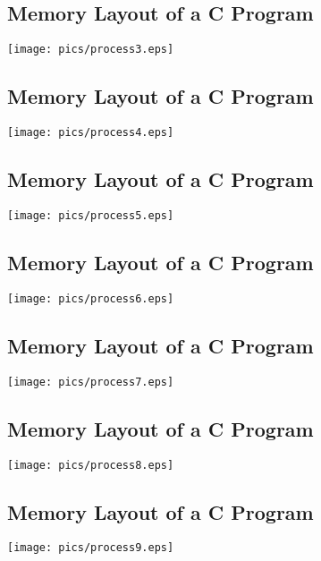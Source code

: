 \documentclass[xga]{xdvislides}
\begin{document}
\subsection{Memory Layout of a C Program}
\begin{center}
	\texttt{[image: pics/process3.eps]}
\end{center}

\subsection{Memory Layout of a C Program}
\begin{center}
	\texttt{[image: pics/process4.eps]}
\end{center}

\subsection{Memory Layout of a C Program}
\begin{center}
	\texttt{[image: pics/process5.eps]}
\end{center}

\subsection{Memory Layout of a C Program}
\begin{center}
	\texttt{[image: pics/process6.eps]}
\end{center}

\subsection{Memory Layout of a C Program}
\begin{center}
	\texttt{[image: pics/process7.eps]}
\end{center}

\subsection{Memory Layout of a C Program}
\begin{center}
	\texttt{[image: pics/process8.eps]}
\end{center}

\subsection{Memory Layout of a C Program}
\begin{center}
	\texttt{[image: pics/process9.eps]}
\end{center}
\end{document}
